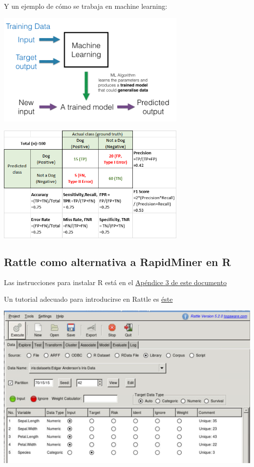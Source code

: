 \documentclass[
]{book}
\begin{document}
Y un ejemplo de cómo se trabaja en machine learning:

\includegraphics[width=0.7\textwidth,height=\textheight]{images/T3-Supervised_ML.png}

\includegraphics[width=0.7\textwidth,height=\textheight]{images/T3-ML-indicadores.png}

\subsection{Rattle como alternativa a RapidMiner en R}\label{rattle-como-alternativa-a-rapidminer-en-r}

Las instrucciones para instalar R está en el \href{https://gltaboada.github.io/tgdbook/instalaci\%C3\%B3n-de-r.html}{Apéndice 3 de este documento}

Un tutorial adecuado para introducirse en Rattle es \href{https://www.dummies.com/programming/using-rattle-iris-r-programming/}{éste}

\includegraphics{images/T3-rattle1.png}
\end{document}
